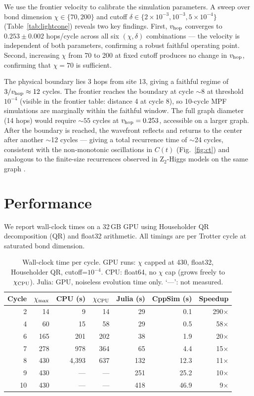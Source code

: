 \documentclass[12pt]{article}
\begin{document}
We use the frontier velocity to calibrate the simulation parameters.
A sweep over bond dimension $\chi \in \{70, 200\}$ and cutoff
$\delta \in \{2\times10^{-3}, 10^{-3}, 5\times10^{-4}\}$ (Table~\ref{tab:lightcone})
reveals two key findings.
First, $v_{\rm hop}$ converges to $0.253 \pm 0.002$ hops/cycle
across all six $(\chi, \delta)$ combinations — the velocity is independent
of both parameters, confirming a robust faithful operating point.
Second, increasing $\chi$ from 70 to 200 at fixed cutoff produces no change
in $v_{\rm hop}$, confirming that $\chi = 70$ is sufficient.

The physical boundary lies 3 hops from site 13, giving a faithful regime
of $3/v_{\rm hop} \approx 12$ cycles.
The frontier reaches the boundary at cycle $\sim$8 at threshold $10^{-4}$
(visible in the frontier table: distance 4 at cycle 8), so
10-cycle MPF simulations are marginally within the faithful window.
The full graph diameter (14 hops) would require $\sim 55$ cycles at
$v_{\rm hop}=0.253$, accessible on a larger graph.
After the boundary is reached, the wavefront reflects and returns to the
center after another $\sim$12 cycles — giving a total recurrence time of
$\sim$24 cycles, consistent with the non-monotonic oscillations in $C(t)$
(Fig.~\ref{fig:ct}) and analogous to the finite-size recurrences observed
in Z$_2$-Higgs models on the same graph \cite{cobos2025z2higgs}.

\section{Performance}
\label{sec:perf}

We report wall-clock times on a 32\,GB GPU using Householder QR decomposition (QR) and float32 arithmetic.
All timings are per Trotter cycle at saturated bond dimension.

\begin{table}[h]
\centering
\small
\caption{Wall-clock time per cycle. GPU runs: $\chi$ capped at 430,
float32, Householder QR, cutoff=$10^{-4}$.
CPU: float64, no $\chi$ cap (grows freely to $\chi_{\rm CPU}$).
Julia: GPU, noiseless evolution time only.
`---': not measured.}
\label{tab:comparison}
\begin{tabular}{rr rrr rr}
\toprule
Cycle & $\chi_{\rm max}$ & CPU (s) & $\chi_{\rm CPU}$ & Julia (s) & CppSim (s) & Speedup \\
\midrule
 2 &  14 &      9 &  14 &  29 &   0.1 & 290$\times$ \\
 4 &  60 &     15 &  58 &  29 &   0.5 &  58$\times$ \\
 6 & 165 &    201 & 202 &  38 &   1.9 &  20$\times$ \\
 7 & 278 &    978 & 364 &  65 &   4.4 &  15$\times$ \\
 8 & 430 &  4{,}393 & 637 & 132 & 12.3 &  11$\times$ \\
 9 & 430 &    --- & --- & 251 &  25.2 &  10$\times$ \\
10 & 430 &    --- & --- & 418 &  46.9 &   9$\times$ \\
\bottomrule
\end{tabular}
\end{table}
\end{document}
